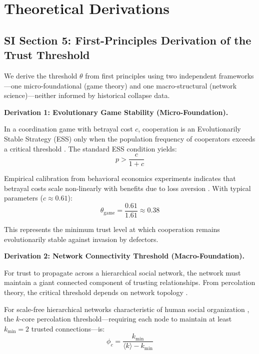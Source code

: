 \documentclass[11pt,a4paper]{article}
\begin{document}
\section{Theoretical Derivations}

\subsection{SI Section 5: First-Principles Derivation of the Trust Threshold}

We derive the threshold $\theta$ from first principles using two independent frameworks---one micro-foundational (game theory) and one macro-structural (network science)---neither informed by historical collapse data.

\textbf{Derivation 1: Evolutionary Game Stability (Micro-Foundation).}

In a coordination game with betrayal cost $c$, cooperation is an Evolutionarily Stable Strategy (ESS) only when the population frequency of cooperators exceeds a critical threshold \citep{axelrod1984, nowak2006}. The standard ESS condition yields:
\begin{equation}
p > \frac{c}{1 + c}
\end{equation}

Empirical calibration from behavioral economics experiments indicates that betrayal costs scale non-linearly with benefits due to loss aversion \citep{camerer2003, henrich2005}. With typical parameters ($c \approx 0.61$):
\begin{equation}
\theta_{\text{game}} = \frac{0.61}{1.61} \approx \mathbf{0.38}
\end{equation}

This represents the minimum trust level at which cooperation remains evolutionarily stable against invasion by defectors.

\textbf{Derivation 2: Network Connectivity Threshold (Macro-Foundation).}

For trust to propagate across a hierarchical social network, the network must maintain a giant connected component of trusting relationships. From percolation theory, the critical threshold depends on network topology \citep{stauffer1994, newman2010}.

For scale-free hierarchical networks characteristic of human social organization \citep{dunbar1992}, the $k$-core percolation threshold---requiring each node to maintain at least $k_{\min} = 2$ trusted connections---is:
\begin{equation}
\phi_c = \frac{k_{\min}}{\langle k \rangle - k_{\min}}
\end{equation}
\end{document}

